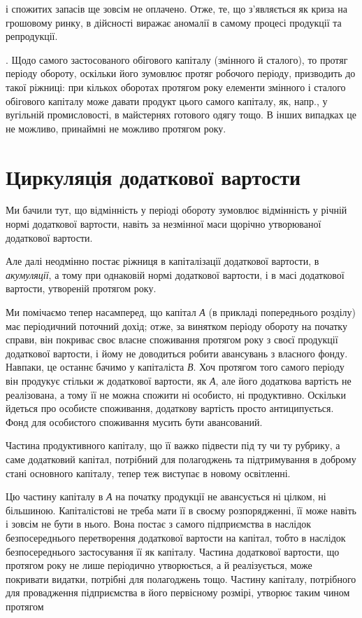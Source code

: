 \parcont{}  %
і спожитих запасів ще зовсім не оплачено. Отже, те, що з’являється
як криза на грошовому ринку, в дійсності виражає аномалії в самому процесі
продукції та репродукції.

. Щодо самого застосованого обігового капіталу (змінного
й сталого), то протяг періоду обороту, оскільки його зумовлює протяг
робочого періоду, призводить до такої ріжниці: при кількох оборотах
протягом року елементи змінного і сталого обігового капіталу може
давати продукт цього самого капіталу, як, напр., у вугільній промисловості,
в майстернях готового одягу тощо. В інших випадках це не можливо,
принаймні не можливо протягом року.

\section{Циркуляція додаткової вартости}

Ми бачили тут, що відмінність у періоді обороту зумовлює відмінність
у річній нормі додаткової вартости, навіть за незмінної маси щорічно
утворюваної додаткової вартости.

Але далі неодмінно постає ріжниця в капіталізації додаткової вартости,
в \emph{акумуляції}, а тому при однаковій нормі додаткової вартости,
і в масі додаткової вартости, утвореній протягом року.

Ми помічаємо тепер насамперед, що капітал \emph{А} (в прикладі попереднього
розділу) має періодичний поточний дохід; отже, за винятком періоду
обороту на початку справи, він покриває своє власне споживання
протягом року з своєї продукції додаткової вартости, і йому не доводиться
робити авансувань з власного фонду. Навпаки, це останнє
бачимо у капіталіста \emph{В}. Хоч протягом того самого періоду він продукує
стільки ж додаткової вартости, як \emph{А}, але його додаткова вартість не
реалізована, а тому її не можна спожити ні особисто, ні продуктивно. Оскільки
йдеться про особисте споживання, додаткову вартість просто антиципується.
Фонд для особистого споживання мусить бути авансований.

Частина продуктивного капіталу, що її важко підвести під ту чи ту
рубрику, а саме додатковий капітал, потрібний для полагоджень та підтримування
в доброму стані основного капіталу, тепер теж виступає в
новому освітленні.

Цю частину капіталу в \emph{А} на початку продукції не авансується ні
цілком, ні більшиною. Капіталістові не треба мати її в своєму розпорядженні,
її може навіть і зовсім не бути в нього. Вона постає з самого
підприємства в наслідок безпосереднього перетворення додаткової вартости
на капітал, тобто в наслідок безпосереднього застосування її як капіталу.
Частина додаткової вартости, що протягом року не лише періодично
утворюється, а й реалізується, може покривати видатки, потрібні для
полагоджень тощо. Частину капіталу, потрібного для провадження підприємства
в його первісному розмірі, утворює таким чином протягом
\parbreak{}  %
